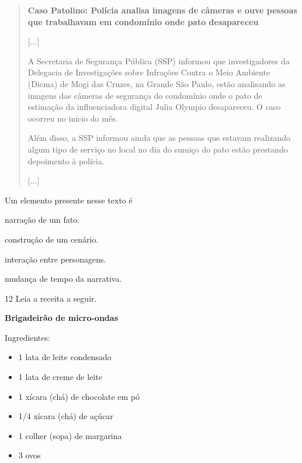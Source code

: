 \begin{quote}
\textbf{Caso Patolino: Polícia analisa imagens de câmeras e ouve pessoas que trabalhavam em condomínio onde pato desapareceu}

{[}...{]}

A Secretaria de Segurança Pública (SSP) informou que investigadores da
Delegacia de Investigações sobre Infrações Contra o Meio Ambiente
(Dicma) de
Mogi
das Cruzes, na Grande São Paulo, estão analisando as imagens das
câmeras de segurança do condomínio onde
o
pato de estimação da influenciadora digital Julia Olympio desapareceu.
O caso ocorreu no início do mês.

Além disso, a SSP informou ainda que as pessoas que estavam realizando
algum tipo de serviço no local no dia do sumiço do pato estão prestando
depoimento à polícia.

{[}...{]}

\end{quote}

Um elemento presente nesse texto é

\begin{escolha}
\item narração de um fato.

\item construção de um cenário.

\item interação entre personagens.

\item mudança de tempo da narrativa.
\end{escolha}



\num{12} Leia a receita a seguir.

\textbf{Brigadeirão de micro-ondas}

Ingredientes:

\begin{itemize}
\item
  1 lata de leite condensado
\item
  1 lata de creme de leite
\item
  1 xícara (chá) de chocolate em pó
\item
  1/4 xícara (chá) de açúcar
\item
  1 colher (sopa) de margarina
\item
  3 ovos
\end{itemize}

